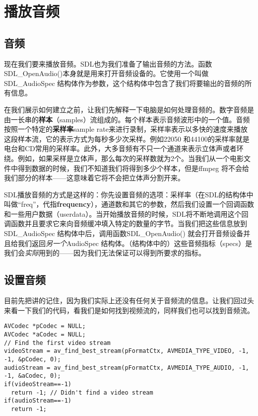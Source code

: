 ﻿\chapter{播放音频}
\label{ch3}
\section{音频}
现在我们要来播放音频。SDL也为我们准备了输出音频的方法。函数SDL_OpenAudio()本身就是用来打开音频设备的。它使用一个叫做SDL_AudioSpec 结构体作为参数，这个结构体中包含了我们将要输出的音频的所有信息。

在我们展示如何建立之前，让我们先解释一下电脑是如何处理音频的。数字音频是由一长串的\textbf{样本}（samples）流组成的。每个样本表示音频波形中的一个值。音频按照一个特定的\textbf{采样率}{sample rate}来进行录制，采样率表示以多快的速度来播放这段样本流，它的表示方式为每秒多少次采样。例如22050 和44100的采样率就是电台和CD常用的采样率。此外，大多音频有不只一个通道来表示立体声或者环绕。例如，如果采样是立体声，那么每次的采样数就为2个。当我们从一个电影文件中得到数据的时候，我们不知道我们将得到多少个样本，但是ffmpeg 将不会给我们部分的样本——这意味着它将不会把立体声分割开来。

SDL播放音频的方式是这样的：你先设置音频的选项：采样率（在SDL的结构体中叫做“freq”，代指\textbf{frequency}），通道数和其它的参数，然后我们设置一个回调函数和一些用户数据（userdata）。当开始播放音频的时候，SDL将不断地调用这个回调函数并且要求它来向音频缓冲填入特定的数量的字节。当我们把这些信息放到SDL_AudioSpec 结构体中后，调用函数SDL_OpenAudio() 就会打开音频设备并且给我们返回\emph{另一个}AudioSpec 结构体。（结构体中的）这些音频指标（specs）是我们会\emph{实际}用到的——因为我们无法保证可以得到所要求的指标。

\section{设置音频}

目前先把讲的记住，因为我们实际上还没有任何关于音频流的信息。让我们回过头来看一下我们的代码，看我们是如何找到视频流的，同样我们也可以找到音频流。

\begin{lstlisting}
AVCodec *pCodec = NULL;
AVCodec *aCodec = NULL;
// Find the first video stream
videoStream = av_find_best_stream(pFormatCtx, AVMEDIA_TYPE_VIDEO, -1, -1, &pCodec, 0);
audioStream = av_find_best_stream(pFormatCtx, AVMEDIA_TYPE_AUDIO, -1, -1, &aCodec, 0);
if(videoStream==-1)
  return -1; // Didn't find a video stream
if(audioStream==-1)
  return -1;
\end{lstlisting}


